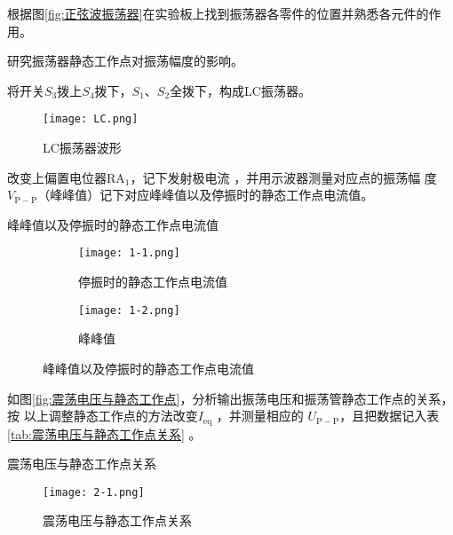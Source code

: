 \documentclass[../main]{subfiles}
\begin{document}
根据图\ref{fig:正弦波振荡器}在实验板上找到振荡器各零件的位置并熟悉各元件的作用。

研究振荡器静态工作点对振荡幅度的影响。

将开关$ S_3 $拨上$ S_4 $拨下，$ S_1 $、$ S_2 $全拨下，构成LC振荡器。

\begin{figure}[htbp]
	\centering
	\texttt{[image: LC.png]}
	\caption{LC振荡器波形}
	\label{fig:LC振荡器波形}
\end{figure}

改变上偏置电位器$ \mathrm{RA}_1 $，记下发射极电流 ，并用示波器测量对应点的振荡幅
度 $ V_\mathrm{P-P} $（峰峰值）记下对应峰峰值以及停振时的静态工作点电流值。

\begin{table}[htbp]
	\centering
	\caption{峰峰值以及停振时的静态工作点电流值}
	\label{tab:峰峰值以及停振时的静态工作点电流值}
\end{table}

\begin{figure}[htbp]
	\centering
	\begin{subfigure}[htbp]{.45\linewidth}
		\centering
		\texttt{[image: 1-1.png]}
		\caption{停振时的静态工作点电流值}
		\label{fig:停振时的静态工作点电流值}
	\end{subfigure}
	\quad
	\begin{subfigure}[htbp]{.45\linewidth}
		\centering
		\texttt{[image: 1-2.png]}
		\caption{峰峰值}
		\label{fig:峰峰值}
	\end{subfigure}
	\caption{峰峰值以及停振时的静态工作点电流值}
	\label{fig:峰峰值以及停振时的静态工作点电流值}
\end{figure}

如图\ref{fig:震荡电压与静态工作点}，分析输出振荡电压和振荡管静态工作点的关系，按
以上调整静态工作点的方法改变$ I_\mathrm{eq} $ ，并测量相应的 $ U_\mathrm{P - P}
$，且把数据记入表 \ref{tab:震荡电压与静态工作点关系} 。

\begin{table}[htbp]
	\centering
	\caption{震荡电压与静态工作点关系}
	\label{tab:震荡电压与静态工作点关系}
\end{table}

\begin{figure}[htbp]
	\centering
	\texttt{[image: 2-1.png]}
	\caption{震荡电压与静态工作点关系}
	\label{fig:震荡电压与静态工作点关系}
\end{figure}
\end{document}
